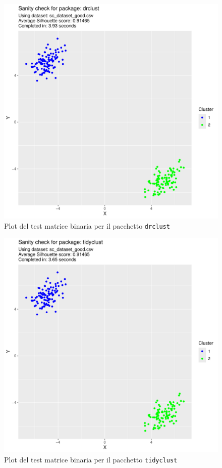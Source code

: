 \documentclass[italian]{article}
\begin{document}
			\begin{figure}[h]
				\includegraphics[width = \textwidth, page = 3]{results/results_DRCLUST.pdf}
				\caption{Plot del test matrice binaria per il pacchetto \texttt{drclust}}
				\label{fig:drclustbm}
			\end{figure}

			\begin{figure}[h]
				\includegraphics[width = \textwidth, page = 3]{results/results_TIDYCLUST.pdf}
				\caption{Plot del test matrice binaria per il pacchetto \texttt{tidyclust}}
				\label{fig:tidyclustbm}
			\end{figure}
\end{document}
